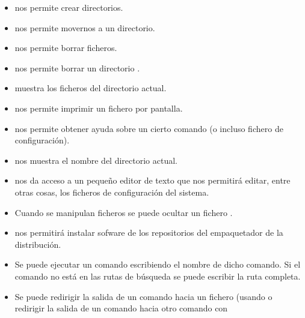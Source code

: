 \documentclass[letterpaper,10pt,spanish]{sphinxmanual}
\begin{document}
\begin{itemize}
\item {} 
 nos permite crear directorios.

\item {} 
 nos permite movernos a un directorio.

\item {} 
 nos permite borrar ficheros.

\item {} 
 nos permite borrar un directorio .

\item {} 
 muestra los ficheros del directorio actual.

\item {} 
 nos permite imprimir un fichero por pantalla.

\item {} 
 nos permite obtener ayuda sobre un cierto comando (o incluso fichero de configuración).

\item {} 
 nos muestra el nombre del directorio actual.

\item {} 
 nos da acceso a un pequeño editor de texto que nos permitirá editar, entre otras cosas, los ficheros de configuración del sistema.

\item {} 
Cuando se manipulan ficheros se puede ocultar un fichero .

\item {} 
 nos permitirá instalar sofware de los repositorios del empaquetador de la distribución.

\item {} 
Se puede ejecutar un comando escribiendo el nombre de dicho comando. Si el comando no está en las rutas de búsqueda se puede escribir la ruta completa.

\item {} 
Se puede redirigir la salida de un comando hacia un fichero (usando   o redirigir la salida de un comando hacia otro comando con 


\end{itemize}
\end{document}
